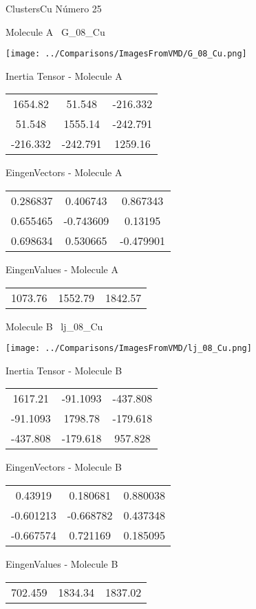\vtab[-3cm]
\begin{center}
{\large ClustersCu \tab Número 25}
\end{center}
\begin{multicols}{2}
\begin{center}

Molecule A \
G\_08\_Cu

\texttt{[image: ../Comparisons/ImagesFromVMD/G\_08\_Cu.png]}

Inertia Tensor - Molecule A \\
\begin{tabular}{|c c c|}
1654.82	 & 	51.548	 & 	-216.332	 \\
51.548	 & 	1555.14	 & 	-242.791	 \\
-216.332	 & 	-242.791	 & 	1259.16
\end{tabular}

\vtab
 EingenVectors - Molecule A     \\
\begin{tabular}{|c c c|}
0.286837	 & 	0.406743	 & 	0.867343	 \\
0.655465	 & 	-0.743609	 & 	0.13195	 \\
0.698634	 & 	0.530665	 & 	-0.479901
\end{tabular}

\vtab
 EingenValues - Molecule A     \\
\begin{tabular}{|c c c|}
1073.76	 & 	1552.79	 & 	1842.57	 \\
\end{tabular}
\columnbreak

Molecule B \
lj\_08\_Cu

\texttt{[image: ../Comparisons/ImagesFromVMD/lj\_08\_Cu.png]}

Inertia Tensor - Molecule B \\
\begin{tabular}{|c c c|}
1617.21	 & 	-91.1093	 & 	-437.808	 \\
-91.1093	 & 	1798.78	 & 	-179.618	 \\
-437.808	 & 	-179.618	 & 	957.828
\end{tabular}

\vtab
 EingenVectors - Molecule B     \\
\begin{tabular}{|c c c|}
0.43919	 & 	0.180681	 & 	0.880038	 \\
-0.601213	 & 	-0.668782	 & 	0.437348	 \\
-0.667574	 & 	0.721169	 & 	0.185095
\end{tabular}

\vtab
 EingenValues - Molecule B     \\
\begin{tabular}{|c c c|}
702.459	 & 	1834.34	 & 	1837.02	 \\
\end{tabular}

\end{center}
\end{multicols}

